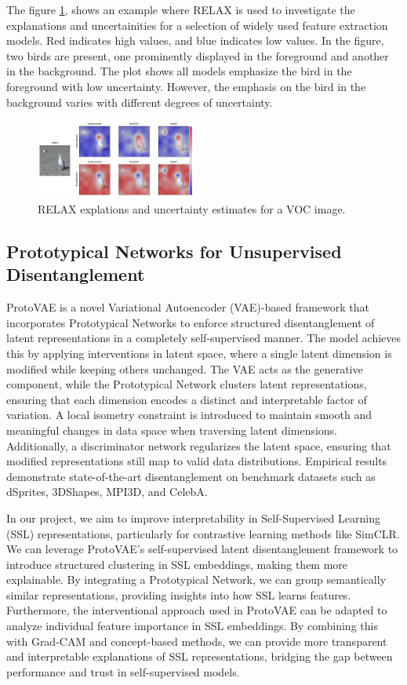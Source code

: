 The figure \ref{fig:relax}, shows an example where RELAX is used to investigate the explanations and uncertainities for a selection of widely used feature extraction models. Red indicates high values, and blue indicates low values. In the figure, two birds are present, one prominently displayed in the foreground and another in the background. The plot shows all models emphasize the bird in the foreground with low uncertainty. However, the emphasis on the bird in the background varies with different degrees of uncertainty. 
\begin{figure}[h]
    \centering
    \includegraphics[width=0.47\textwidth]{./images/VOCexample.pdf}
    \caption{RELAX explations and uncertainty estimates for a VOC image.}
    \label{fig:relax}
\end{figure}

\subsection{Prototypical Networks for Unsupervised Disentanglement}
ProtoVAE is a novel Variational Autoencoder (VAE)-based framework\cite{patil2023protovaeprototypicalnetworksunsupervised} that incorporates Prototypical Networks to enforce structured disentanglement of latent representations in a completely self-supervised manner. The model achieves this by applying interventions in latent space, where a single latent dimension is modified while keeping others unchanged. The VAE acts as the generative component, while the Prototypical Network clusters latent representations, ensuring that each dimension encodes a distinct and interpretable factor of variation. A local isometry constraint is introduced to maintain smooth and meaningful changes in data space when traversing latent dimensions. Additionally, a discriminator network regularizes the latent space, ensuring that modified representations still map to valid data distributions. Empirical results demonstrate state-of-the-art disentanglement on benchmark datasets such as dSprites, 3DShapes, MPI3D, and CelebA.

In our project, we aim to improve interpretability in Self-Supervised Learning (SSL) representations, particularly for contrastive learning methods like SimCLR. We can leverage ProtoVAE’s self-supervised latent disentanglement framework to introduce structured clustering in SSL embeddings, making them more explainable. By integrating a Prototypical Network, we can group semantically similar representations, providing insights into how SSL learns features. Furthermore, the interventional approach used in ProtoVAE can be adapted to analyze individual feature importance in SSL embeddings. By combining this with Grad-CAM and concept-based methods, we can provide more transparent and interpretable explanations of SSL representations, bridging the gap between performance and trust in self-supervised models.
